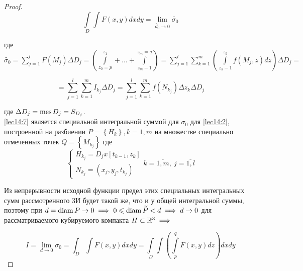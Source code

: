 \documentclass[../../main.tex]{subfiles}
\begin{document}
\begin{proof}
		\begin{equation}
		\int\limits_D \int F\left(x, y\right) dxdy = \lim\limits_{\widetilde{d_0} 
		\to 0} \widetilde{\sigma_0} \label{lec14:6}
		\end{equation}
		
		где $\widetilde{\sigma_0} = \sum\limits_{j = 1}^{l} F\left(M_j\right) \Delta 
		D_j = \left(\int\limits_{z_0 = p}^{z_1} + \ldots + \int\limits_{z_m - 
		1}^{z_m = q} \right) = \sum\limits_{j = 1}^{l} \sum\limits_{k = 1}^{m} 
		\left(\int\limits_{z_k - 1}^{z_k} f(M_j, z)dz\right) \Delta D_j = $
		
		\begin{equation}
		= \sum\limits_{j = 1}^{l} \sum\limits_{k = 1}^{m} I_{k_j} \Delta D_j = 
		\sum\limits_{j = 1}^{l} \sum\limits_{k = 1}^{m} f\left(N_{k_j}\right) \Delta 
		z_k \Delta D_j \label{lec14:7}
		\end{equation}
		
		где $\Delta D_j = \operatorname{mes} D_j = S_{D_j}$.\\
		
		\eqref{lec14:7} является специальной интегральной суммой для $\sigma_0$ для 
		\eqref{lec14:2}, построенной на разбиении $P = \left\{ H_k \right\}, k = 
		\overline{1, m}$ на множестве специально отмеченных точек $Q = \left\{ 
		M_{k_j}\right\}$ где 
		\[
		\begin{cases}
		H_{k_j} = D_j x \left[t_{k - 1}, z_k\right]\\
		N_{k_j} = (x_j, y_j, t_{k_j})
		\end{cases} k = \overline{1, m}, \ j = \overline{1, l}
		\]
		
		Из непрерывности исходной функции предел этих специальных интегральных сумм 
		рассмотренного 3И будет такой же, что и у общей интегральной суммы, поэтому 
		при $d = \operatorname{diam} P \to 0 \implies 0 \leqslant \operatorname{diam} \widetilde{P} < d \implies d 
		\to 0$ для рассматриваемого кубируемого компакта $H \subset \mathbb{R}^3 \implies$
		
		\begin{equation}
		I = \lim\limits_{d \to 0} \sigma_0 = \int_{D} \int F\left(x, y\right) dxdy = 
		\int\limits_D \int \left(\int\limits_{p}^{q} F\left(x, y\right) dz\right) 
		dxdy \label{lec14:9}
		\end{equation}
		
	\end{proof}
	
\end{document}
